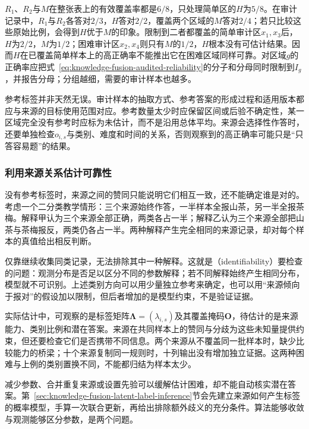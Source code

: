$R_1$、$R_2$与$M$在整张表上的有效覆盖率都是$6/8$，只处理简单区的$H$为$5/8$。在审计记录中，$R_1$与$R_2$各答对$2/3$，$H$答对$2/2$，覆盖两个区域的$M$答对$2/4$；若只比较这些原始比例，会得到$H$优于$M$的印象。限制到二者都覆盖的简单审计区$x_1,x_3$后，$H$为$2/2$，$M$为$1/2$；困难审计区$x_2,x_4$则只有$M$的$1/2$，$H$根本没有可估计结果。因而$H$在已覆盖简单样本上的高正确率不能推出它在困难区域同样可靠。对区域$g$的正确率应把式~\eqref{eq:knowledge-fusion-audited-reliability}的分子和分母同时限制到$I_g$，并报告分母；分组越细，需要的审计样本也越多。

参考标签并非天然无误。审计样本的抽取方式、参考答案的形成过程和适用版本都应与来源的目标使用范围对应。参考数量太少时应保留区间或后验不确定性，某一区域完全没有参考时应标为未估计，而不是沿用总体平均。来源会选择性作答时，还要单独检查$o_{i,s}$与类别、难度和时间的关系，否则观察到的高正确率可能只是“只答容易题”的结果。

\subsubsection{利用来源关系估计可靠性}
\label{sec:knowledge-fusion-relational-reliability}

没有参考标签时，来源之间的赞同只能说明它们相互一致，还不能确定谁是对的。考虑一个二分类教学情形：三个来源始终作答，一半样本全报山茶，另一半全报茶梅。解释甲认为三个来源全部正确，两类各占一半；解释乙认为三个来源全部把山茶与茶梅报反，两类仍各占一半。两种解释产生完全相同的来源记录，却对每个样本的真值给出相反判断。

仅靠继续收集同类记录，无法排除其中一种解释。这就是（identifiability）要检查的问题：观测分布是否足以区分不同的参数解释；若不同解释始终产生相同分布，模型就不可识别。上述类别方向可以用少量独立参考来确定，也可以用“来源倾向于报对”的假设加以限制，但后者增加的是模型约束，不是验证证据。

实际估计中，可观察的是标签矩阵$\bm{\Lambda}=(\lambda_{i,s})$及其覆盖掩码$\bm{O}$，待估计的是来源能力、类别比例和潜在答案。来源在共同样本上的赞同与分歧为这些未知量提供约束，但还要检查它们是否携带不同信息。两个来源从不覆盖同一批样本时，缺少比较能力的桥梁；十个来源复制同一规则时，十列输出没有增加独立证据。这两种困难与上例的类别置换不同，不能都归结为样本太少。

减少参数、合并重复来源或设置先验可以缓解估计困难，却不能自动核实潜在答案。第~\ref{sec:knowledge-fusion-latent-label-inference}节会先建立来源如何产生标签的概率模型，手算一次联合更新，再给出排除额外歧义的充分条件。算法能够收敛与观测能够区分参数，是两个问题。

